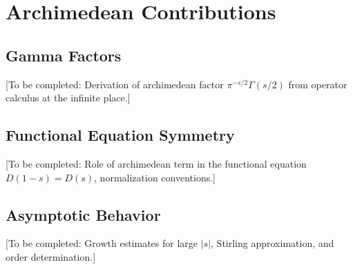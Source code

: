 \section{Archimedean Contributions}

\subsection{Gamma Factors}

[To be completed: Derivation of archimedean factor $\pi^{-s/2} \Gamma(s/2)$ from operator calculus at the infinite place.]

\subsection{Functional Equation Symmetry}

[To be completed: Role of archimedean term in the functional equation $D(1-s) = D(s)$, normalization conventions.]

\subsection{Asymptotic Behavior}

[To be completed: Growth estimates for large $|s|$, Stirling approximation, and order determination.]
